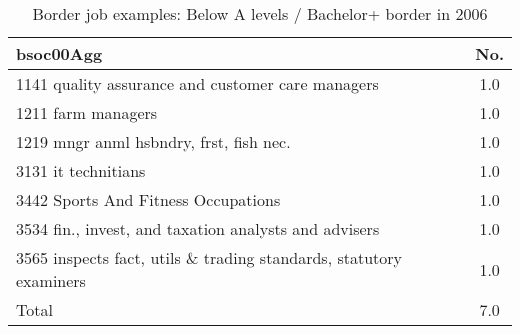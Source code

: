 \begin{table}[h!]
	\centering
	\caption{Border job examples: Below A levels / Bachelor+ border in 2006}
	\begin{tabular}{lc}
	\toprule
bsoc00Agg&No. \\
\hline
1141 quality assurance and customer care managers&1.0 \\
1211 farm managers&1.0 \\
1219 mngr anml hsbndry, frst, fish nec.&1.0 \\
3131 it technitians&1.0 \\
3442 Sports And Fitness Occupations&1.0 \\
3534 fin., invest, and taxation analysts and advisers&1.0 \\
3565 inspects fact, utils \& trading standards, statutory examiners&1.0 \\
Total&7.0 \\
\bottomrule
\bottomrule
\end{tabular}
\end{table}
